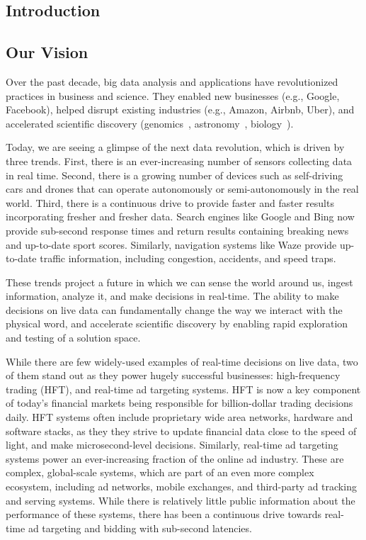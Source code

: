 \documentclass [10pt]{article}
\begin{document}
\begin{outline}
\section{Introduction}

\subsection{Our Vision} 

Over the past decade, big data analysis and applications have revolutionized practices in business and science. They enabled new businesses (e.g., Google, Facebook), helped disrupt existing industries (e.g., Amazon, Airbnb, Uber), and accelerated scientific discovery (genomics~\cite{genomics-big-data}, astronomy~\cite{astronomy-big-data}, biology~\cite{biology-big-data}).

Today, we are seeing a glimpse of the next data revolution, which is driven by three trends. First, there is an ever-increasing number of sensors collecting data in real time. Second, there is a growing number of devices such as self-driving cars and drones that can operate autonomously or semi-autonomously in the real world. Third, there is a continuous drive to provide faster and faster results incorporating fresher and fresher data. Search engines like Google and Bing now provide sub-second response times and return results containing breaking news and up-to-date sport scores. Similarly, navigation systems like Waze provide up-to-date traffic information, including congestion, accidents, and speed traps.

These trends project a future in which we can sense the world around us, ingest information, analyze it, and make decisions in real-time. The ability to make decisions on live data can fundamentally change the way we interact with the physical word, and accelerate scientific discovery by enabling rapid exploration and testing of a solution space.

While there are few widely-used examples of real-time decisions on live data, two of them stand out as they power hugely successful businesses: high-frequency trading (HFT), and real-time ad targeting systems. HFT is now a key component of today's financial markets being responsible for billion-dollar trading decisions daily. HFT systems often include proprietary wide area networks, hardware and software stacks, as they they strive to update financial data close to the speed of light, and make microsecond-level decisions. Similarly, real-time ad targeting systems power an ever-increasing fraction of the online ad industry. These are complex, global-scale systems, which are part of an even more complex ecosystem, including ad networks, mobile exchanges, and third-party ad tracking and serving systems. While there is relatively little public information about the performance of these systems, there has been a continuous drive towards real-time ad targeting and bidding with sub-second latencies.


\end{outline}
\end{document}
